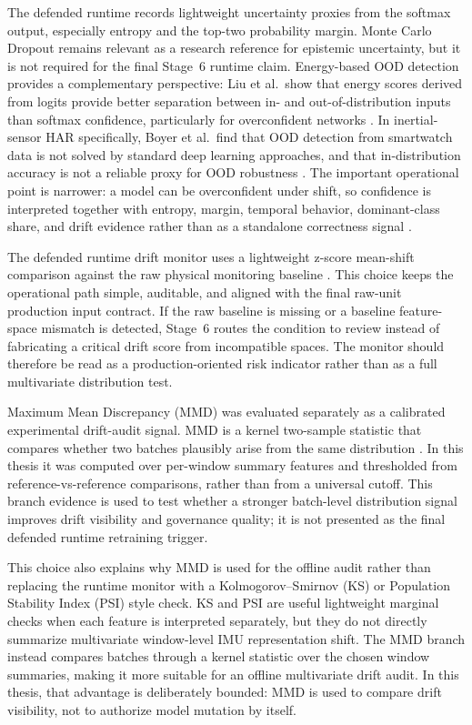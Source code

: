 The defended runtime records lightweight uncertainty proxies from the softmax output, especially entropy and the top-two probability margin. Monte Carlo Dropout \cite{gal2016dropout} remains relevant as a research reference for epistemic uncertainty, but it is not required for the final Stage~6 runtime claim. Energy-based OOD detection provides a complementary perspective: Liu et al.\ show that energy scores derived from logits provide better separation between in- and out-of-distribution inputs than softmax confidence, particularly for overconfident networks \cite{liu2020energy}. In inertial-sensor HAR specifically, Boyer et al.\ find that OOD detection from smartwatch data is not solved by standard deep learning approaches, and that in-distribution accuracy is not a reliable proxy for OOD robustness \cite{boyer2021ood}. The important operational point is narrower: a model can be overconfident under shift, so confidence is interpreted together with entropy, margin, temporal behavior, dominant-class share, and drift evidence rather than as a standalone correctness signal \cite{guo2017calibration,akbari2020personalizing}.

The defended runtime drift monitor uses a lightweight z-score mean-shift comparison against the raw physical monitoring baseline \cite{zenisek2019drift}. This choice keeps the operational path simple, auditable, and aligned with the final raw-unit production input contract. If the raw baseline is missing or a baseline feature-space mismatch is detected, Stage~6 routes the condition to review instead of fabricating a critical drift score from incompatible spaces. The monitor should therefore be read as a production-oriented risk indicator rather than as a full multivariate distribution test.

Maximum Mean Discrepancy (MMD) was evaluated separately as a calibrated experimental drift-audit signal. MMD is a kernel two-sample statistic that compares whether two batches plausibly arise from the same distribution \cite{gretton2012kernel}. In this thesis it was computed over per-window summary features and thresholded from reference-vs-reference comparisons, rather than from a universal cutoff. This branch evidence is used to test whether a stronger batch-level distribution signal improves drift visibility and governance quality; it is not presented as the final defended runtime retraining trigger.

This choice also explains why MMD is used for the offline audit rather than replacing the runtime monitor with a Kolmogorov--Smirnov (KS) or Population Stability Index (PSI) style check. KS and PSI are useful lightweight marginal checks when each feature is interpreted separately, but they do not directly summarize multivariate window-level IMU representation shift. The MMD branch instead compares batches through a kernel statistic over the chosen window summaries, making it more suitable for an offline multivariate drift audit. In this thesis, that advantage is deliberately bounded: MMD is used to compare drift visibility, not to authorize model mutation by itself.

